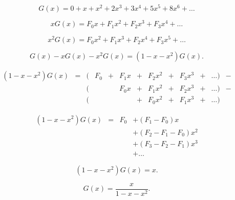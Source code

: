 \documentclass[tikz]{scrreprt}
\begin{document}
\begin{equation}
G(x) = 0 + x + x^2 + 2x^3 + 3x^4 + 5x^5 + 8x^6 + \dots
\end{equation}

\begin{equation}
xG(x) = F_0x + F_1x^2 + F_2x^3 + F_3x^4 + \dots
\end{equation}

\begin{equation}
x^2G(x) = F_0x^2 + F_1x^3 + F_2x^4 + F_3x^5 + \dots
\end{equation}

\begin{equation}
G(x) - xG(x) - x^2G(x) = (1-x-x^2)G(x).
\end{equation}

\begin{align*}
(1-x-x^2)G(x) & = & (&F_0 & + & F_1x & + & F_2x^2 & + & F_3x^3 & + & \dots) & - \\
              &   & (&    &   & F_0x & + & F_1x^2 & + & F_2x^3 & + & \dots) & - \\
              &   & (&    &   &      & + & F_0x^2 & + & F_1x^3 & + & \dots) &
\end{align*}

\begin{align*}
(1-x-x^2)G(x) & = & F_0 & + (F_1 - F_0)x \\
              &   &     & + (F_2 - F_1 - F_0)x^2 \\
              &   &     & + (F_3 - F_2 - F_1)x^3 \\
              &   &     & + \dots
\end{align*}

\begin{equation}
(1-x-x^2)G(x) = x.
\end{equation}

\begin{equation}
G(x) = \frac{x}{1-x-x^2}.
\end{equation}

\end{document}
